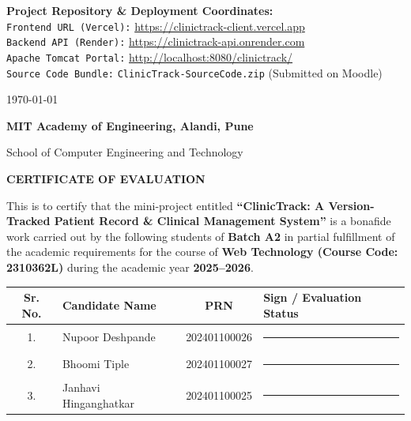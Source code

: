 \documentclass[12pt,a4paper,oneside]{report}
\newcommand{\projectTitle}{ClinicTrack: A Version-Tracked Patient Record \& Clinical Management System}
\newcommand{\courseName}{Web Technology (Course Code: 2310362L)}
\newcommand{\academicYear}{2025--2026}
\newcommand{\institutionName}{MIT Academy of Engineering, Alandi, Pune}
\newcommand{\departmentName}{School of Computer Engineering and Technology}
\newcommand{\batchGroup}{Batch A2}
\begin{document}
\begin{titlepage}
    \vfill
    
    \begin{minipage}[t]{0.9\textwidth}
        \centering
        \textbf{Project Repository \& Deployment Coordinates:} \\
        \small
        \texttt{Frontend URL (Vercel):} \url{https://clinictrack-client.vercel.app} \\
        \texttt{Backend API (Render):} \url{https://clinictrack-api.onrender.com} \\
        \texttt{Apache Tomcat Portal:} \url{http://localhost:8080/clinictrack/} \\
        \texttt{Source Code Bundle:} \texttt{ClinicTrack-SourceCode.zip} (Submitted on Moodle)
    \end{minipage}

    \vspace{0.5cm}
    {\normalsize\today \par}
\end{titlepage}

\newpage
\thispagestyle{plain}
\begin{center}
    {\Large\bfseries \institutionName \par}
    {\large \departmentName \par}
    \vspace{0.8cm}
    {\LARGE\bfseries\color{ctDark} CERTIFICATE OF EVALUATION \par}
    \vspace{0.6cm}
\end{center}

This is to certify that the mini-project entitled \textbf{``\projectTitle''} is a bonafide work carried out by the following students of \textbf{\batchGroup} in partial fulfillment of the academic requirements for the course of \textbf{\courseName} during the academic year \textbf{\academicYear}.

\vspace{0.8cm}

\begin{table}[h!]
\centering
\begin{tabularx}{\textwidth}{c l c X}
\toprule
\textbf{Sr. No.} & \textbf{Candidate Name} & \textbf{PRN} & \textbf{Sign / Evaluation Status} \\
\midrule
1. & Nupoor Deshpande & 202401100026 & \rule{3.5cm}{0.4pt} \\
2. & Bhoomi Tiple & 202401100027 & \rule{3.5cm}{0.4pt} \\
3. & Janhavi Hinganghatkar & 202401100025 & \rule{3.5cm}{0.4pt} \\
\bottomrule
\end{tabularx}
\end{table}
\end{document}
